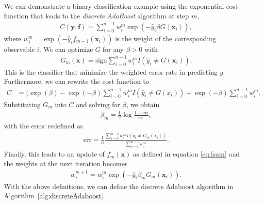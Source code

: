 We can demonstrate a binary classification example using the exponential cost function that leads to the \textit{discrete AdaBoost} algorithm \cite{Friedman2000} at step $m$,
\begin{align}
  C(\boldsymbol{y},\boldsymbol{f}) = \sum_{i=0}^{n-1} w_i^m \exp(-\hat{y}_i\beta G(\boldsymbol{x}_i)),
\end{align}
where $w_i^m = \exp(-\hat{y}_if_{m-1}(\boldsymbol{x}_i))$ is the weight of the corresponding observable $i$.
We can optimize $G$ for any $\beta>0$ with
\begin{align}
  G_m(\boldsymbol{x}) = \text{sign} \sum_{i=0}^{n-1} w_i^m I(\hat{y}_i \neq G(\boldsymbol{x}_i)).
\end{align}
This is the classifier that minimize the weighted error rate in predicting $y$. Furthermore, we can rewrite the cost function to
\begin{align}
    C &= (\exp(\beta)-\exp(-\beta)\sum_{i=0}^{n-1} w_i^m I(\hat{y}_i \neq G(x_i)) + \exp(-\beta)\sum_{i=0}^{n-1}w_i^m.
    \label{eq:exponentialcost}
\end{align}
Substituting $G_m$ into $C$ and solving for $\beta$, we obtain
\begin{align}
  \beta_m = \frac{1}{2} \log \frac{1 - \overline{\text{err}}}{\overline{\text{err}}},
\end{align}
with the error redefined as
\begin{align}
  \overline{\text{err}} = \frac{1}{n} \frac{ \sum_{i=0}^{n-1} w_i^m I(\hat{y}_i \neq G_m(\boldsymbol{x}_i)) }{\sum_{i=0}^{n-1} w_i^m}.
\end{align}
Finally, this leads to an update of $f_m(\boldsymbol{x})$ as defined in equation \ref{eq:fsam} and the weights at the next iteration becomes
\begin{align}
  w_i^{m+1} = w_i^m \exp (-\hat{y}_i \beta_m G_m(\boldsymbol{x}_i)).
\end{align}
With the above definitions, we can define the discrete Adaboost algorithm in Algorithm~\ref{alg:discreteAdaboost}.

